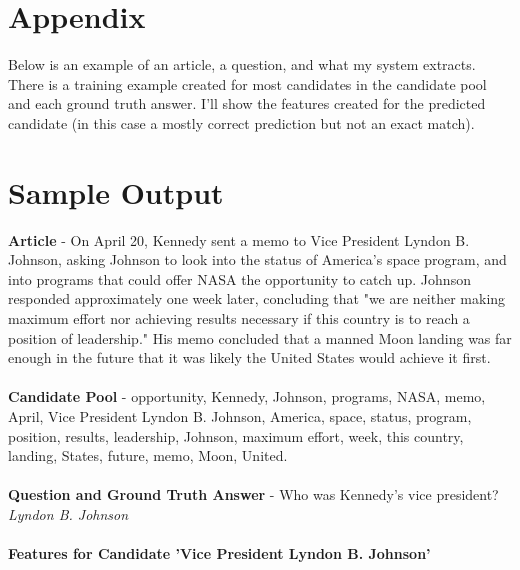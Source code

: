 \documentclass[a4paper, 11pt]{article} %
\begin{document}
\newpage

\section*{Appendix}

Below is an example of an article, a question, and what my system extracts. There is a training example created for most candidates in the candidate pool and each ground truth answer. I'll show the features created for the predicted candidate (in this case a mostly correct prediction but not an exact match).

\section*{Sample Output}

\textbf{Article} - On April 20, Kennedy sent a memo to Vice President Lyndon B. Johnson, asking Johnson to look into the status of America's space program, and into programs that could offer NASA the opportunity to catch up. Johnson responded approximately one week later, concluding that "we are neither making maximum effort nor achieving results necessary if this country is to reach a position of leadership." His memo concluded that a manned Moon landing was far enough in the future that it was likely the United States would achieve it first.
\\~\\
\textbf{Candidate Pool} - opportunity, Kennedy, Johnson, programs, NASA, memo, April, Vice President Lyndon B. Johnson, America, space, status, program, position, results, leadership, Johnson, maximum effort, week, this country, landing, States, future, memo, Moon, United.
\\~\\
\textbf{Question and Ground Truth Answer} - Who was Kennedy's vice president? \textit{Lyndon B. Johnson}
\\~\\
\textbf{Features for Candidate 'Vice President Lyndon B. Johnson'}
\end{document}
